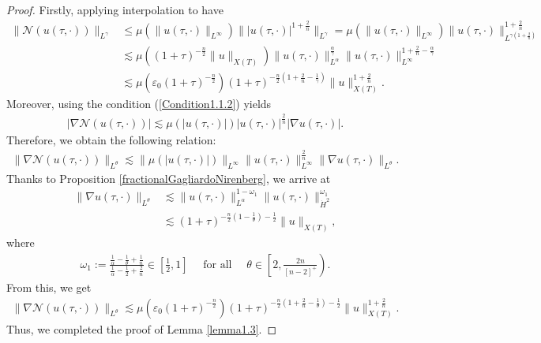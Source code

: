 \documentclass[11pt,reqno]{amsart}
\begin{document}
\begin{proof}
    Firstly, applying interpolation to have
    \begin{align*}
        \|\mathcal{N}(u(\tau,\cdot))\|_{L^{\gamma}} &\leq \mu(\|u(\tau,\cdot)\|_{L^\infty})\||u(\tau,\cdot)|^{1+\frac{2}{n}}\|_{L^\gamma}  = \mu(\|u(\tau,\cdot)\|_{L^\infty})\|u(\tau,\cdot)\|_{L^{\gamma(1+\frac{2}{n})}}^{1+\frac{2}{n}} \\
        &\lesssim \mu\left((1+\tau)^{-\frac{n}{2}} \|u\|_{X(T)}\right) \|u(\tau,\cdot)\|_{L^{\alpha}}^{\frac{\alpha}{\gamma}} \|u(\tau,\cdot)\|_{L^{\infty}}^{1+\frac{2}{n}-\frac{\alpha}{\gamma}}  \\
        &\lesssim \mu\left(\varepsilon_0 (1+\tau)^{-\frac{n}{2}}\right)(1+\tau)^{-\frac{n}{2}(1+\frac{2}{n}-\frac{1}{\gamma})}  \|u\|_{X(T)}^{1+\frac{2}{n}}.
    \end{align*}
   Moreover, using the condition (\ref{Condition1.1.2}) yields
   \begin{align*}
       |\nabla \mathcal{N}(u(\tau, \cdot))| \lesssim \mu(|u(\tau,\cdot)|) |u(\tau,\cdot)|^{\frac{2}{n}} |\nabla u(\tau,\cdot)|.
   \end{align*}
   Therefore, we obtain the following relation:
   \begin{align*}
       \|\nabla \mathcal{N}(u(\tau,\cdot))\|_{L^\theta} \lesssim \|\mu(|u(\tau,\cdot)|)\|_{L^\infty} \|u(\tau, \cdot)\|_{L^\infty}^{\frac{2}{n}} \|\nabla u(\tau,\cdot)\|_{L^{\theta}}.
   \end{align*}
   Thanks to Proposition \ref{fractionalGagliardoNirenberg}, we arrive at
   \begin{align*}
       \|\nabla u(\tau,\cdot)\|_{L^\theta} &\lesssim \|u(\tau,\cdot)\|_{L^{\alpha}}^{1-\omega_1} \|u(\tau,\cdot)\|_{\dot{H}^2}^{\omega_1}\\
       &\lesssim (1+\tau)^{-\frac{n}{2}(1-\frac{1}{\theta})-\frac{1}{2}} \|u\|_{X(T)},
   \end{align*}
   where 
   \begin{align*}
       \omega_1 := \displaystyle\frac{\displaystyle\frac{1}{\alpha}-\frac{1}{\theta}+\frac{1}{n}}{\displaystyle\frac{1}{\alpha}-\frac{1}{2}+\frac{2}{n}} \in \left[\frac{1}{2}, 1\right]  \quad\text{ for all } \quad \theta \in \left[2, \frac{2n}{[n-2]^+}\right).
   \end{align*}
   From this, we get 
   \begin{align*}
       \|\nabla \mathcal{N}(u(\tau,\cdot))\|_{L^\theta} \lesssim \mu\left(\varepsilon_0 (1+\tau)^{-\frac{n}{2}}\right) (1+\tau)^{-\frac{n}{2}(1+\frac{2}{n}-\frac{1}{\theta})-\frac{1}{2}} \|u\|_{X(T)}^{1+\frac{2}{n}}.
   \end{align*}
   Thus, we completed the proof of Lemma \ref{lemma1.3}.
\end{proof}
\end{document}
